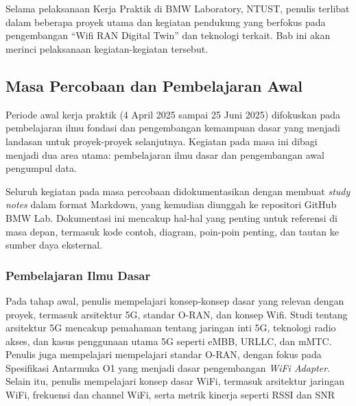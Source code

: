 \chapter{\babEmpat}
Selama pelaksanaan Kerja Praktik di BMW Laboratory, NTUST, penulis terlibat dalam beberapa proyek utama dan kegiatan pendukung yang berfokus pada pengembangan ``Wifi RAN Digital Twin'' dan teknologi terkait. Bab ini akan merinci pelaksanaan kegiatan-kegiatan tersebut.

\section{Masa Percobaan dan Pembelajaran Awal}
Periode awal kerja praktik (4 April 2025 sampai 25 Juni 2025) difokuskan pada pembelajaran ilmu fondasi dan pengembangan kemampuan dasar yang menjadi landasan untuk proyek-proyek selanjutnya. Kegiatan pada masa ini dibagi menjadi dua area utama: pembelajaran ilmu dasar dan pengembangan awal pengumpul data.

Seluruh kegiatan pada masa percobaan didokumentasikan dengan membuat \textit{study notes} dalam format Markdown, yang kemudian diunggah ke repositori GitHub BMW Lab. Dokumentasi ini mencakup hal-hal yang penting untuk referensi di masa depan, termasuk kode contoh, diagram, poin-poin penting, dan tautan ke sumber daya eksternal.

\subsection{Pembelajaran Ilmu Dasar}

Pada tahap awal, penulis mempelajari konsep-konsep dasar yang relevan dengan proyek, termasuk arsitektur 5G, standar O-RAN, dan konsep Wifi. Studi tentang arsitektur 5G mencakup pemahaman tentang jaringan inti 5G, teknologi radio akses, dan kasus penggunaan utama 5G seperti eMBB, URLLC, dan mMTC. Penulis juga mempelajari mempelajari standar O-RAN, dengan fokus pada Spesifikasi Antarmuka O1 yang menjadi dasar pengembangan \textit{WiFi Adapter}. Selain itu, penulis mempelajari konsep dasar WiFi, termasuk arsitektur jaringan WiFi, frekuensi dan channel WiFi, serta metrik kinerja seperti RSSI dan SNR

